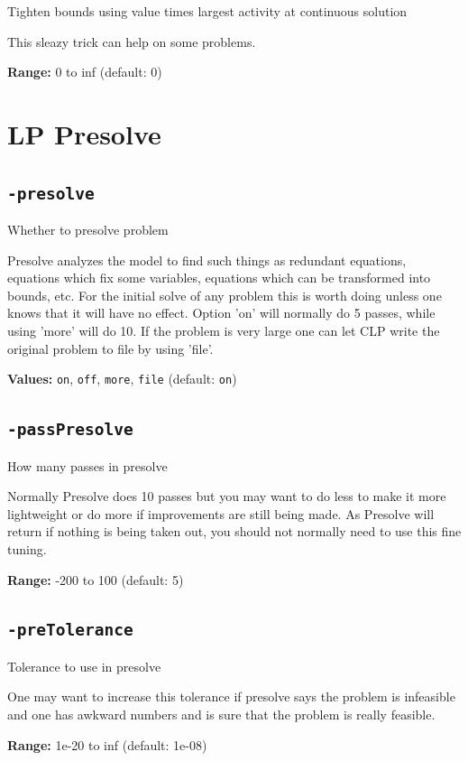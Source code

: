 \documentclass[11pt,a4paper]{article}
\begin{document}
Tighten bounds using value times largest activity at continuous solution

This sleazy trick can help on some problems.

\textbf{Range:} 0 to inf (default: 0)

\section{LP Presolve}

\subsection*{\texttt{-presolve}}

Whether to presolve problem

Presolve analyzes the model to find such things as redundant equations, equations which fix some variables, equations which can be transformed into bounds, etc. For the initial solve of any problem this is worth doing unless one knows that it will have no effect. Option 'on' will normally do 5 passes, while using 'more' will do 10.  If the problem is very large one can let CLP write the original problem to file by using 'file'.

\textbf{Values:} \texttt{on}, \texttt{off}, \texttt{more}, \texttt{file} (default: \texttt{on})

\subsection*{\texttt{-passPresolve}}

How many passes in presolve

Normally Presolve does 10 passes but you may want to do less to make it more lightweight or do more if improvements are still being made.  As Presolve will return if nothing is being taken out, you should not normally need to use this fine tuning.

\textbf{Range:} -200 to 100 (default: 5)

\subsection*{\texttt{-preTolerance}}

Tolerance to use in presolve

One may want to increase this tolerance if presolve says the problem is infeasible and one has awkward numbers and is sure that the problem is really feasible.

\textbf{Range:} 1e-20 to inf (default: 1e-08)
\end{document}
